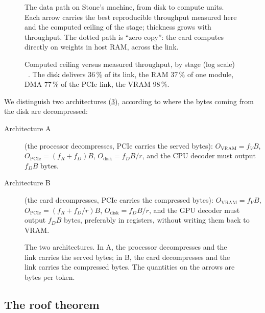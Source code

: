 \begin{figure}[p]
\centering
\SchemaChemin
\caption[The data path, from disk to compute units]{The data path on Stone's machine, from disk to compute units. Each arrow carries the best reproducible throughput measured here and the computed ceiling of the stage; thickness grows with throughput. The dotted path is \enquote{zero copy}: the card computes directly on weights in host RAM, across the link.}
\label{fig:chemin}
\end{figure}

\begin{figure}[ht]
\centering
\GrapheEtages
\caption[Computed ceiling versus measured throughput, by stage]{Computed ceiling versus measured throughput, by stage (log scale) \mes~\calc. The disk delivers 36\,\% of its link, the RAM 37\,\% of one module, DMA 77\,\% of the PCIe link, the VRAM 98\,\%.}
\label{fig:etages}
\end{figure}

We distinguish two architectures (\cref{fig:architectures}), according to where the bytes coming from the disk are decompressed:
\begin{description}
\item[Architecture A] (the processor decompresses, PCIe carries the served bytes):
$O_{\mathrm{VRAM}} = f_V B$, $O_{\mathrm{PCIe}} = (f_R + f_D) B$, $O_{\mathrm{disk}} = f_D B / r$, and the CPU decoder must output $f_D B$ bytes.
\item[Architecture B] (the card decompresses, PCIe carries the compressed bytes):
$O_{\mathrm{VRAM}} = f_V B$, $O_{\mathrm{PCIe}} = (f_R + f_D/r) B$, $O_{\mathrm{disk}} = f_D B / r$, and the GPU decoder must output $f_D B$ bytes, preferably in registers, without writing them back to VRAM.
\end{description}

\begin{figure}[ht]
\centering
\SchemaArchitectures
\caption[Architectures A and B]{The two architectures. In A, the processor decompresses and the link carries the served bytes; in B, the card decompresses and the link carries the compressed bytes. The quantities on the arrows are bytes per token.}
\label{fig:architectures}
\end{figure}

\subsection{The roof theorem}

